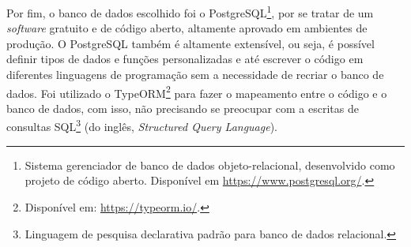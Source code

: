Por fim, o banco de dados escolhido foi o PostgreSQL\footnote{Sistema gerenciador de banco de dados objeto-relacional, desenvolvido como projeto de código aberto. Disponível em \url{https://www.postgresql.org/}.}, por se tratar de um \textit{software} gratuito e de código aberto, altamente aprovado em ambientes de produção. O PostgreSQL também é altamente extensível, ou seja, é possível definir tipos de dados e funções personalizadas e até escrever o código em diferentes linguagens de programação sem a necessidade de recriar o banco de dados. Foi utilizado o TypeORM\footnote{Disponível em: \url{https://typeorm.io/}.} para fazer o mapeamento entre o código e o banco de dados, com isso, não precisando se preocupar com a escritas de consultas SQL\footnote{Linguagem de pesquisa declarativa padrão para banco de dados relacional.} (do inglês, \textit{Structured Query Language}).
